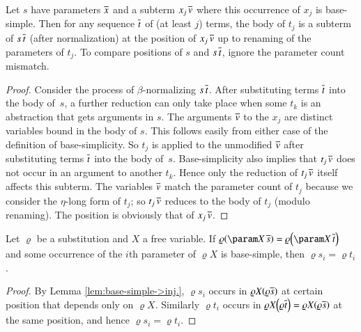   \begin{lemma}\label{lem:base-simple->inj.}
  Let $s$ have parameters $\overline{x}$ and a subterm $x_{j}\,\overline{v}$ 
  where this occurrence of $x_{j}$ is base-simple.
  Then for any sequence $\overline{t}$ of (at least $j$) terms, the body of
  $t_{j}$ is a subterm of $s\,\overline{t}$ (after normalization) at the position
  of $x_{j}\,\overline{v}$ up to renaming of the parameters of $t_{j}$. 
  To compare positions of $s$ and $s\,\overline{t}$, ignore
  the parameter count mismatch.
  \end{lemma}
  \begin{proof}
  Consider the process of $\beta$-normalizing $s\,\overline{t}$. After substituting
  terms $\overline{t}$ into the body of~$s$, a further reduction can only
  take place when some $t_{k}$ is an abstraction that gets arguments in
  $s$. The arguments $\overline{v}$ to the $x_{j}$ are distinct variables
  bound in the body of $s$. This follows easily from either case of the
  definition of base-simplicity. So $t_{j}$ is applied to the unmodified
  $\overline{v}$ after substituting
  terms $\overline{t}$ into the body of~$s$. Base-simplicity also implies
  that $t_{j}\,\overline{v}$ does not occur in an argument to another
  $t_{k}$. Hence only the reduction of $t_{j}\,\overline{v}$ itself affects this
  subterm. The variables $\overline{v}$ match the parameter count of $t_{j}$
  because we consider the $\eta$-long form of $t_{j}$; so $t_{j}\,\overline{v}$ reduces to the body
  of $t_{j}$ (modulo renaming). The position is obviously that of $x_{j}\,\overline{v}$.
  \end{proof}
  \begin{lemma}[$\jp C{4 strengthened}$]\label{lem:eq-if-omega-simple}Let $\varrho$ be a substitution and $X$ a free
    variable. If $\varrho\left(\param X\,\seq s\right)=\varrho\left(\param X\,\seq t\right)$
    and some occurrence of the $i$th parameter of $\varrho X$
    is base-simple, then $\varrho s_{i}=\varrho t_{i}$.
    \end{lemma}
    \begin{proof}
    By Lemma \ref{lem:base-simple->inj.}, $\varrho s_{i}$ occurs in
    $\varrho X\left(\varrho\seq s\right)$ at certain position that depends
    only on $\varrho X$. Similarly $\varrho t_{i}$ occurs in $\varrho X\left(\varrho\seq t\right)=\varrho X\left(\varrho\seq s\right)$
    at the same position, and hence $\varrho s_{i}=\varrho t_{i}$.
    \end{proof}
